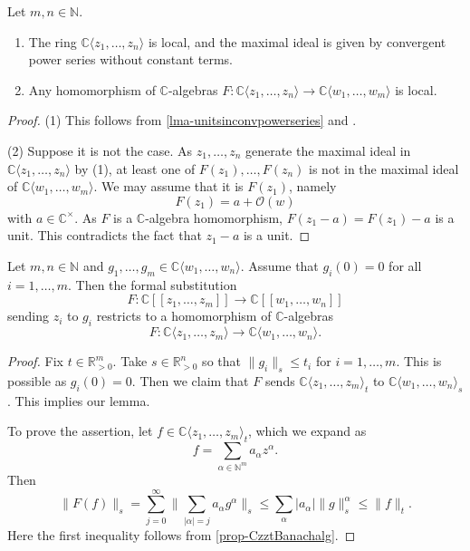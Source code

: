 \begin{thm}\label{thm-converinglocal}
    Let $m, n\in \mathbb{N}$.
\begin{enumerate}
    \item The ring $\mathbb{C}\langle z_1,\ldots,z_n \rangle$ is local, and the maximal ideal is given by convergent power series without constant terms.
    \item Any homomorphism of $\mathbb{C}$-algebras $F:\mathbb{C}\langle z_1,\ldots,z_n \rangle\rightarrow \mathbb{C}\langle w_1,\ldots,w_m \rangle$ is local.
\end{enumerate}


\end{thm}
\begin{proof}
(1) This follows from \cref{lma-unitsinconvpowerseries} and \cite[\href{https://stacks.math.columbia.edu/tag/00E9}{Tag 00E9}]{stacks-project}.

(2) Suppose it is not the case. As $z_1,\ldots,z_n$ generate the maximal ideal in $\mathbb{C}\langle z_1,\ldots,z_n \rangle$ by (1), at least one of $F(z_1),\ldots,F(z_n)$ is not in the maximal ideal of  $\mathbb{C}\langle w_1,\ldots,w_m \rangle$. We may assume that it is $F(z_1)$, namely
\[
    F(z_1)=a+\mathcal{O}(w)  
\]
with $a\in \mathbb{C}^{\times}$. As $F$ is a $\mathbb{C}$-algebra homomorphism, $F(z_1-a)=F(z_1)-a$ is a unit. This contradicts the fact that $z_1-a$ is a unit.
\end{proof}




\begin{lemma}\label{lma-univerpropconvspecialcase}
    Let $m,n\in \mathbb{N}$ and $g_1,\ldots,g_m\in \mathbb{C}\langle w_1,\ldots,w_n\rangle$. Assume that $g_i(0)=0$ for all $i=1,\ldots,m$. 
    Then the formal substitution 
    \[
        F:\mathbb{C}[[z_1,\ldots,z_m]]\rightarrow \mathbb{C}[[w_1,\ldots,w_n]]
    \]
    sending $z_i$ to $g_i$ restricts to a homomorphism of $\mathbb{C}$-algebras
    \[
        F:  \mathbb{C}\langle z_1,\ldots,z_m\rangle\rightarrow  \mathbb{C}\langle w_1,\ldots,w_n\rangle.
    \]
\end{lemma}
\begin{proof}
    Fix $t\in \mathbb{R}^m_{>0}$. Take $s\in \mathbb{R}^n_{>0}$ so that $\|g_i\|_s\leq t_i$ for $i=1,\ldots,m$. This is possible as $g_i(0)=0$.
    Then we claim that $F$ sends $\mathbb{C}\langle z_1,\ldots,z_m \rangle_t$ to $\mathbb{C}\langle w_1,\ldots,w_n\rangle_s$. This implies our lemma.

    To prove the assertion, let $f\in \mathbb{C}\langle z_1,\ldots,z_m \rangle_t$, which we expand as
    \[
        f=\sum_{\alpha\in \mathbb{N}^m} a_{\alpha}z^{\alpha}.
    \]
    Then
    \[
        \|F(f)\|_s=\sum_{j=0}^{\infty}\|\sum_{|\alpha|=j}a_{\alpha}g^{\alpha}\|_s\leq \sum_{\alpha}|a_{\alpha}|\|g\|_s^{\alpha}\leq \|f\|_t.
    \]
    Here the first inequality follows from \cref{prop-CzztBanachalg}.
\end{proof}

